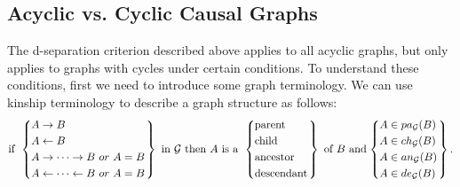 \documentclass[twoside, 11pt]{article}
\begin{document}
\subsection{Acyclic vs. Cyclic Causal Graphs} \label{acyclicvscyclic}
The d-separation criterion described above applies to all acyclic graphs, but only applies to graphs with cycles under certain conditions. To understand these conditions, first we need to introduce some graph terminology. We can use kinship terminology to describe a graph structure as follows:
\begin{equation*}
\text{if }
  \begin{rcases}
    \begin{dcases}
      A \rightarrow B \\
      A \leftarrow B \\
      A \rightarrow \cdots \rightarrow B \,\,or \,\,A = B \\
      A \leftarrow \cdots \leftarrow B \,\,or \,\,A = B
\end{dcases}
  \end{rcases}
  \text{ in } \mathcal{G} \text{ then } A \text{ is a }
  \begin{rcases}
    \begin{dcases}
      \text{parent} \\
      \text{child} \\
      \text{ancestor} \\
      \text{descendant}
\end{dcases}
  \end{rcases}
\text{ of } B \text{ and}
  \begin{rcases}
    \begin{dcases}
      A \in pa_{\mathcal{G}}(B) \\
      A \in ch_{\mathcal{G}}(B) \\
      A \in an_{\mathcal{G}}(B) \\
      A \in de_{\mathcal{G}}(B)
\end{dcases}
  \end{rcases}
\text{.}
\end{equation*}
\end{document}
